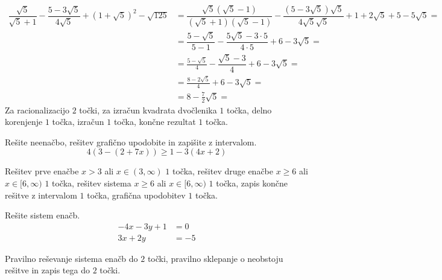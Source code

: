 \documentclass[addpoints]{exam}
\begin{document}
\begin{questions}
    \begin{solution}[7cm]
        \begin{align*} 
            \dfrac{\sqrt{5}}{\sqrt{5}+1}-\dfrac{5-3\sqrt{5}}{4\sqrt{5}}+\left(1+\sqrt{5}\right)^2-\sqrt{125}&=\dfrac{\sqrt{5}(\sqrt{5}-1)}{(\sqrt{5}+1)(\sqrt{5}-1)}-\dfrac{(5-3\sqrt{5})\sqrt{5}}{4\sqrt{5}\sqrt{5}}+1+2\sqrt{5}+5-5\sqrt{5}= \\
                                                                                                            &=\dfrac{5-\sqrt{5}}{5-1}-\dfrac{5\sqrt{5}-3\cdot 5}{4\cdot 5}+6-3\sqrt{5}= \\
                                                                                                            &=\frac{5-\sqrt{5}}{4}-\dfrac{\sqrt{5}-3}{4}+6-3\sqrt{5}= \\
                                                                                                            &=\frac{8-2\sqrt{5}}{4}+6-3\sqrt{5}= \\
                                                                                                            &=8-\frac{7}{2}\sqrt{5}= 
        \end{align*}
        Za racionalizacijo $2$ točki, za izračun kvadrata dvočlenika $1$ točka, delno korenjenje $1$ točka, izračun $1$ točka, končne rezultat $1$ točka.
    \end{solution}
    
    

    \question[4]
    Rešite neenačbo, rešitev grafično upodobite in zapišite z intervalom.
    $$ 4\left(3-\left(2+7x\right)\right)\geq 1-3\left(4x+2\right) $$
    
    
    \begin{solution}[6cm]
        Rešitev prve enačbe $x>3$ ali $x\in(3,\infty)$ $1$ točka, rešitev druge enačbe $x\geq 6$ ali $x\in[6,\infty)$ $1$ točka, rešitev sistema $x\geq 6$ ali $x\in[6,\infty)$ $1$ točka, zapis končne rešitve z intervalom $1$ točka, grafična upodobitev $1$ točka.
    \end{solution}

    \newpage

    \question[4]
    Rešite sistem enačb.
    $$ \begin{aligned}
        -4x-3y+1&=0 \\ 3x+2y&=-5
    \end{aligned} $$
    
    
    \begin{solution}[12cm]
        Pravilno reševanje sistema enačb do $2$ točki, pravilno sklepanje o neobstoju rešitve in zapis tega do $2$ točki.
    \end{solution}




\end{questions}
\end{document}

